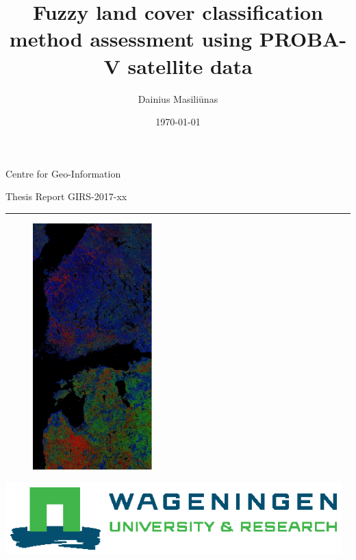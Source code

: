 \documentclass[a4paper,12pt]{scrbook}
\title{Fuzzy land cover classification method assessment using PROBA-V satellite data}
\author{Dainius Masili\=unas}
\date{\today}
\begin{document}

\begin{titlingpage}
  {\Large Centre for Geo-Information}\vspace{0.9cm}
  
  {\Large Thesis Report GIRS-2017-xx}\vspace{0.9cm}
  
  \hrule\vspace{1.1cm}
  
  {\bfseries \Large \MakeUppercase{\thetitle}}\vspace{2.0cm}
  
  \begin{figure}
    \centering
    \includegraphics[height=9.5cm]{thesis-figures/figures-qgis/fulltile-rf}
    \vspace{-110pt}
  \end{figure}
  
  {\Large \theauthor} \vspace{5.9cm}
  
   \vspace{0.5cm}
  
  \includegraphics[width=13cm]{wur-template/WUR_RGB_standard}
  
  \noindent{}
  

\end{titlingpage}
\end{document}
